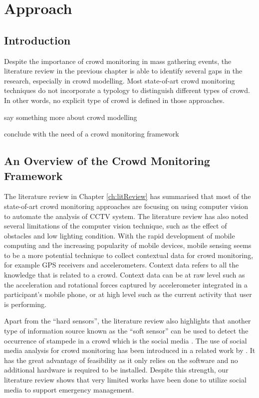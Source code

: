 \chapter{Approach}
\label{ch:approach}
\ifpdf
\graphicspath{{Chapter3/Figs/Raster/}{Chapter3/Figs/PDF/}{Chapter3/Figs/}}
\else
\graphicspath{{Chapter3/Figs/Vector/}{Chapter3/Figs/}}
\fi

\section{Introduction}
\label{sec:approachIntro}
Despite the importance of crowd monitoring in mass gathering events, the literature review in the previous chapter is able to identify several gaps in the research, especially in crowd modelling. Most state-of-art crowd monitoring techniques do not incorporate a typology to distinguish different types of crowd. In other words, no explicit type of crowd is defined in those approaches.

say something more about crowd modelling

conclude with the need of a crowd monitoring framework

\section{An Overview of the Crowd Monitoring Framework}

The literature review in Chapter \ref{ch:litReview} has summarised that most of the state-of-art crowd monitoring approaches are focusing on using computer vision to automate the analysis of CCTV system. The literature review has also noted several limitations of the computer vision technique, such as the effect of obstacles and low lighting condition. With the rapid development of mobile computing and the increasing popularity of mobile devices, mobile sensing seems to be a more potential technique to collect contextual data for crowd monitoring, for example GPS receivers and accelerometers. Context data refers to all the knowledge that is related to a crowd. Context data can be at raw level such as the acceleration and rotational forces captured by accelerometer integrated in a participant's mobile phone, or at high level such as the current activity that user is performing.

Apart from the ``hard sensors'', the literature review also highlights that another type of information source known as the ``soft sensor'' can be used to detect the occurrence of stampede in a crowd which is the social media \citep{Ramesh2014}. The use of social media analysis for crowd monitoring has been introduced in a related work by \citet{DelirHaghighi2013}. It has the great advantage of feasibility as it only relies on the software and no additional hardware is required to be installed. Despite this strength, our literature review shows that very limited works have been done to utilize social media to support emergency management.

